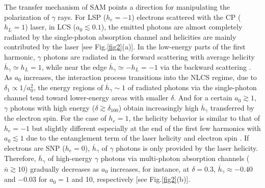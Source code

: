 \documentclass[10pt,twocolumn,showpacs,amsmath,amssymb,floatfix,superscriptaddress]{revtex4-2}
\begin{document}
The transfer mechanism of SAM points a direction for manipulating the polarization of $\gamma$ rays. For LSP ($h_e=-1$) electrons scattered with the CP ($h_L=1$) laser, in LCS ($a_0 \lesssim 0.1$), the emitted photons are almost completely radiated by the single-photon absorption channel and helicities are mainly contributed by the laser [see Fig.\ref{fig2}(a)]. In the low-energy parts of the first harmonic, $\gamma$ photons are radiated in the forward scattering with average helicity $\overline{h}_\gamma \simeq h_L = 1$, while near the edge $\overline{h}_\gamma \simeq -h_L = -1$ via the backward scattering \cite{Babusci1995}. As $a_0$ increases, the interaction process transitions into the NLCS regime, due to $\delta_1 \propto 1/a_0^2$, the energy regions of $\overline{h}_\gamma \sim 1$ of radiated photons via the single-photon channel tend toward lower-energy areas with smaller $\delta$. And for a certain $a_0 \gtrsim 1$, $\gamma$ photons with high energy ($\delta \gtrsim \delta_{100}$) obtain increasingly high $\overline{h}_\gamma$ transferred by the electron spin. For the case of $h_e=1$, the helicity behavior is similar to that of $h_e=-1$ but slightly different especially at the end of the first few harmonics with $a_0 \lesssim 1$ due to the entanglement term of the laser helicity and electron spin \cite{Supplemental}. If electrons are SNP ($h_e=0$), $\overline{h}_\gamma$ of $\gamma$ photons is only provided by the laser helicity. Therefore, $\overline{h}_\gamma$ of high-energy $\gamma$ photons via multi-photon absorption channels ($\overline{n} \gtrsim 10$) gradually decreases as $a_0$ increases, for instance, at $\delta=0.3$, $\overline{h}_\gamma \approx -0.40$ and $-$0.03 for $a_0=1$ and 10, respectively [see Fig.\ref{fig2}(b)].       
\end{document}
